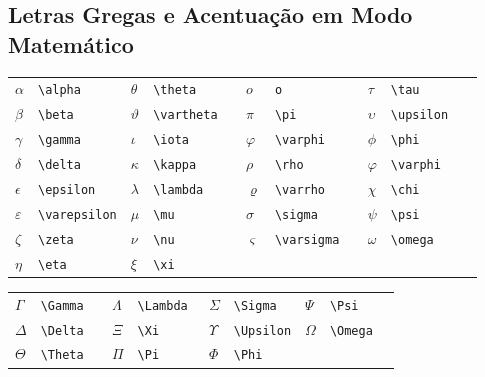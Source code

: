 \documentclass[fleqn]{profmat-cefet}
\begin{document}
\begin{spacing}{1}

\section{Letras Gregas e Acentuação em Modo Matemático}

\begin{longtable}{p{4mm}p{25mm}p{4mm}p{25mm}p{4mm}p{25mm}p{4mm}p{25mm}} \hline
  $\alpha     $ & \lstinline!\alpha     ! & 
  $\theta     $ & \lstinline!\theta     ! & 
  $o          $ & \lstinline!o          ! & 
  $\tau       $ & \lstinline!\tau       ! \\
  $\beta      $ & \lstinline!\beta      ! & 
  $\vartheta  $ & \lstinline!\vartheta  ! & 
  $\pi        $ & \lstinline!\pi        ! & 
  $\upsilon   $ & \lstinline!\upsilon   ! \\
  $\gamma     $ & \lstinline!\gamma     ! & 
  $\iota      $ & \lstinline!\iota      ! & 
  $\varphi    $ & \lstinline!\varphi    ! & 
  $\phi       $ & \lstinline!\phi       ! \\
  $\delta     $ & \lstinline!\delta     ! & 
  $\kappa     $ & \lstinline!\kappa     ! & 
  $\rho       $ & \lstinline!\rho       ! & 
  $\varphi    $ & \lstinline!\varphi    ! \\
  $\epsilon   $ & \lstinline!\epsilon   ! & 
  $\lambda    $ & \lstinline!\lambda    ! & 
  $\varrho    $ & \lstinline!\varrho    ! & 
  $\chi       $ & \lstinline!\chi       ! \\
  $\varepsilon$ & \lstinline!\varepsilon! & 
  $\mu        $ & \lstinline!\mu        ! & 
  $\sigma     $ & \lstinline!\sigma     ! & 
  $\psi       $ & \lstinline!\psi       ! \\
  $\zeta      $ & \lstinline!\zeta      ! & 
  $\nu        $ & \lstinline!\nu        ! & 
  $\varsigma  $ & \lstinline!\varsigma  ! & 
  $\omega     $ & \lstinline!\omega     ! \\
  $\eta       $ & \lstinline!\eta       ! & 
  $\xi        $ & \lstinline!\xi        ! \\ \hline
\end{longtable}

\begin{longtable}{p{4mm}p{25mm}p{4mm}p{25mm}p{4mm}p{25mm}p{4mm}p{25mm}} \hline
  $\Gamma  $ & \lstinline!\Gamma  ! &
  $\Lambda $ & \lstinline!\Lambda ! &
  $\Sigma  $ & \lstinline!\Sigma  ! &
  $\Psi    $ & \lstinline!\Psi    ! \\
  $\Delta  $ & \lstinline!\Delta  ! &
  $\Xi     $ & \lstinline!\Xi     ! &
  $\Upsilon$ & \lstinline!\Upsilon! &
  $\Omega  $ & \lstinline!\Omega  ! \\
  $\Theta  $ & \lstinline!\Theta  ! &
  $\Pi     $ & \lstinline!\Pi     ! &
  $\Phi    $ & \lstinline!\Phi    ! \\ \hline
\end{longtable}


\end{spacing}
\end{document}
